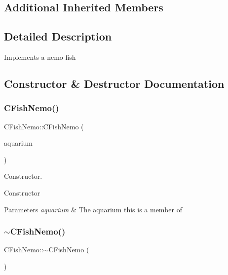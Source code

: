 \subsection*{Additional Inherited Members}


\subsection{Detailed Description}
Implements a nemo fish 

\subsection{Constructor \& Destructor Documentation}
\mbox{\label{class_c_fish_nemo_ab5cc8d119b0c9d8dc62a0e2b6f6e731d}} 
\subsubsection{\texorpdfstring{C\+Fish\+Nemo()}{CFishNemo()}}
{\footnotesize\ttfamily C\+Fish\+Nemo\+::\+C\+Fish\+Nemo (\begin{DoxyParamCaption}\item[{\hyperlink{class_c_aquarium}{C\+Aquarium} $\ast$}]{aquarium }\end{DoxyParamCaption})}



Constructor. 

Constructor 
\begin{DoxyParams}{Parameters}
{\em aquarium} & The aquarium this is a member of \\
\hline
\end{DoxyParams}
\mbox{\label{class_c_fish_nemo_ac37da91b4738144d3b47674450861b26}} 
\subsubsection{\texorpdfstring{$\sim$\+C\+Fish\+Nemo()}{~CFishNemo()}}
{\footnotesize\ttfamily C\+Fish\+Nemo\+::$\sim$\+C\+Fish\+Nemo (\begin{DoxyParamCaption}{ }\end{DoxyParamCaption})\hspace{0.3cm}{\ttfamily [virtual]}}



